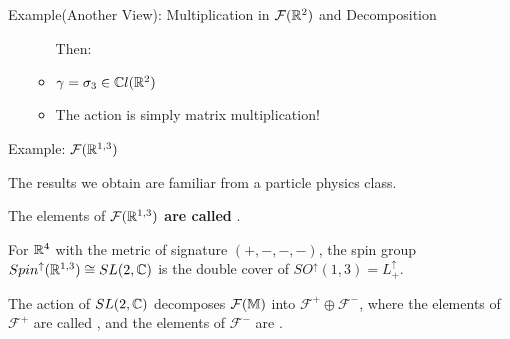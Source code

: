 \begin{frame}{Example(Another View): Multiplication in $\mathcal F(\mathbb R^2)$ and Decomposition}
\begin{itemize}
\begin{itemize}
        
        Then:
        
        \item $\gamma = \sigma_3 \in \mathbb C l(\mathbb R^2)$
        
        \item The action is simply matrix multiplication!
        
        \end{itemize}
    
    \end{itemize}
    

\end{frame}

\begin{frame}{Example: $\mathcal F(\mathbb R^{1, 3})$} %
    
    The results we obtain are familiar from a particle physics class. 
    
    The elements of \textbf{$\mathcal F(\mathbb R^{1, 3})$ are called }.
    
    For $\mathbb R^4$ with the metric of signature $(+, -, -, -)$, the spin group $Spin^\uparrow(\mathbb R^{1, 3}) \cong SL(2, \mathbb C)$ is the double cover of $SO^\uparrow(1, 3) = L^\uparrow_+$.
    
    The action of $SL(2, \mathbb C)$ decomposes $\mathcal F(\mathbb M)$ into $\mathcal F^+ \oplus \mathcal F^-$, where the elements of $\mathcal F^+$ are called , and the elements of $\mathcal F^-$ are .
    
\end{frame}


